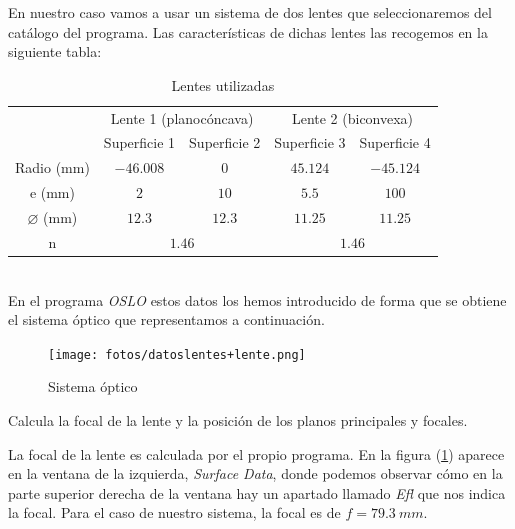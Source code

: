 \documentclass[11pt]{article}
\newcommand{\preguntaAlaMadreDeRocio}[1]{\begin{Theorem}{#1}{}\end{Theorem}}
\begin{document}
        \noindent En nuestro caso vamos a usar un sistema de dos lentes que seleccionaremos del catálogo del programa. Las características de dichas lentes las recogemos en la siguiente tabla:
        \begin{table}[ht]
            \centering
            \begin{tabular}{c|cc|cc|}
                \cline{2-5}
                \multicolumn{1}{l|}{}                    & \multicolumn{2}{c|}{Lente 1 (planocóncava)}      & \multicolumn{2}{c|}{Lente 2 (biconvexa)}         \\ \cline{2-5} 
                \multicolumn{1}{l|}{}                    & \multicolumn{1}{c|}{Superficie 1} & Superficie 2 & \multicolumn{1}{c|}{Superficie 3} & Superficie 4 \\ \hline
                \multicolumn{1}{|c|}{Radio (mm)}         & \multicolumn{1}{c|}{$-46.008$}    & $0$          & \multicolumn{1}{c|}{$45.124$}     & $-45.124$    \\ \hline
                \multicolumn{1}{|c|}{e (mm)}             & \multicolumn{1}{c|}{$2$}          & $10$         & \multicolumn{1}{c|}{$5.5$}        & $100$        \\ \hline
                \multicolumn{1}{|c|}{$\varnothing$ (mm)} & \multicolumn{1}{c|}{$12.3$}       & $12.3$       & \multicolumn{1}{c|}{$11.25$}      & $11.25$      \\ \hline
                \multicolumn{1}{|c|}{n}                  & \multicolumn{2}{c|}{$1.46$}                      & \multicolumn{2}{c|}{$1.46$}                      \\ \hline
            \end{tabular}
            \caption{Lentes utilizadas}
        \end{table}\\

        \noindent En el programa \textit{OSLO} estos datos los hemos introducido de forma que se obtiene el sistema óptico que representamos a continuación.
        \begin{figure}[ht]
            \centering
            \texttt{[image: fotos/datoslentes+lente.png]}
            \caption{Sistema óptico}
            \label{fig:proyecto}
        \end{figure}
    
        \clearpage
        \preguntaAlaMadreDeRocio{Calcula la focal de la lente y la posición de los planos principales y focales.}
        
        \noindent La focal de la lente es calculada por el propio programa. En la figura (\ref{fig:proyecto}) aparece en la ventana de la izquierda, \textit{Surface Data}, donde podemos observar cómo en la parte superior derecha de la ventana hay un apartado llamado \textit{Efl} que nos indica la focal. Para el caso de nuestro sistema, la focal es de $f = 79.3\ mm$.\\
\end{document}
